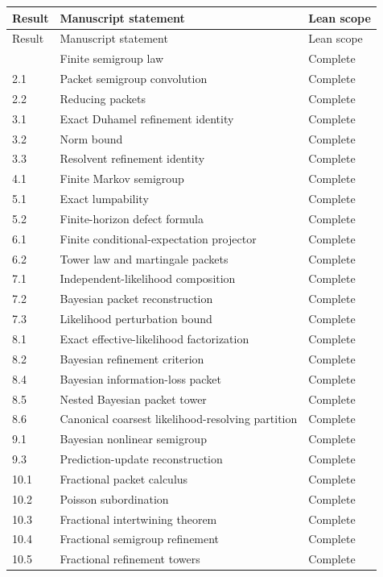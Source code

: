 \small
\begin{longtable}{@{}p{}p{}p{}@{}}
\toprule Result & Manuscript statement & Lean scope\\
\midrule\endfirsthead
\toprule Result & Manuscript statement & Lean scope\\\midrule\endhead
\bottomrule\endfoot
1.2 & Finite semigroup law & Complete\\
2.1 & Packet semigroup convolution & Complete\\
2.2 & Reducing packets & Complete\\
3.1 & Exact Duhamel refinement identity & Complete\\
3.2 & Norm bound & Complete\\
3.3 & Resolvent refinement identity & Complete\\
4.1 & Finite Markov semigroup & Complete\\
5.1 & Exact lumpability & Complete\\
5.2 & Finite-horizon defect formula & Complete\\
6.1 & Finite conditional-expectation projector & Complete\\
6.2 & Tower law and martingale packets & Complete\\
7.1 & Independent-likelihood composition & Complete\\
7.2 & Bayesian packet reconstruction & Complete\\
7.3 & Likelihood perturbation bound & Complete\\
8.1 & Exact effective-likelihood factorization & Complete\\
8.2 & Bayesian refinement criterion & Complete\\
8.4 & Bayesian information-loss packet & Complete\\
8.5 & Nested Bayesian packet tower & Complete\\
8.6 & Canonical coarsest likelihood-resolving partition & Complete\\
9.1 & Bayesian nonlinear semigroup & Complete\\
9.3 & Prediction-update reconstruction & Complete\\
10.1 & Fractional packet calculus & Complete\\
10.2 & Poisson subordination & Complete\\
10.3 & Fractional intertwining theorem & Complete\\
10.4 & Fractional semigroup refinement & Complete\\
10.5 & Fractional refinement towers & Complete\\

\end{longtable}
